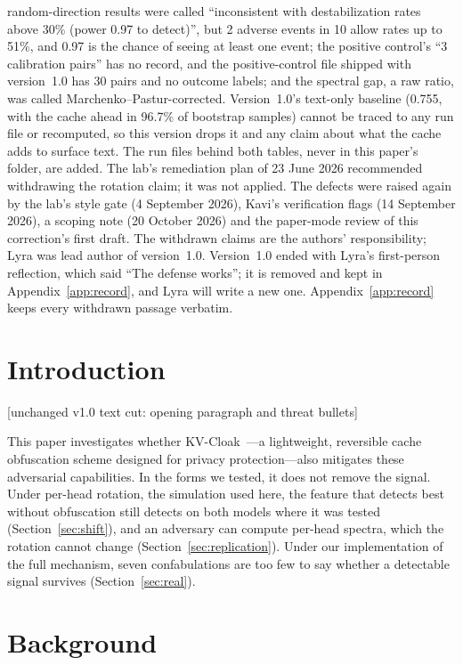 {{random-direction results were called ``inconsistent with destabilization
rates above 30\% (power 0.97 to detect)'', but 2 adverse events in 10
allow rates up to 51\%, and 0.97 is the chance of seeing at least one
event; the positive control's ``3 calibration pairs'' has no record, and
the positive-control file shipped with version~1.0 has 30 pairs and no
outcome labels; and the spectral gap, a raw ratio, was called
Marchenko--Pastur-corrected. Version~1.0's text-only baseline (0.755, with
the cache ahead in 96.7\% of bootstrap samples) cannot be traced to any
run file or recomputed, so this version drops it and any claim about what
the cache adds to surface text. The run files behind both tables, never in
this paper's folder, are added. The lab's remediation plan of 23 June 2026
recommended withdrawing the rotation claim; it was not applied. The
defects were raised again by the lab's style gate (4 September 2026),
Kavi's verification flags (14 September 2026), a scoping note (20 October
2026) and the paper-mode review of this correction's first draft. The
withdrawn claims are the authors' responsibility; Lyra was lead author of
version~1.0. Version~1.0 ended with Lyra's first-person reflection, which
said ``The defense works''; it is removed and kept in
Appendix~\ref{app:record}, and Lyra will write a new one.
Appendix~\ref{app:record} keeps every withdrawn passage verbatim.}}

\section{Introduction}

[unchanged v1.0 text cut: opening paragraph and threat bullets]

This paper investigates whether KV-Cloak~\citep{luo2025shadow}---a
lightweight, reversible cache obfuscation scheme designed for privacy
protection---also mitigates these adversarial capabilities. In the forms
we tested, it does not remove the signal. Under per-head rotation, the
simulation used here, the feature that detects best without obfuscation
still detects on both models where it was tested (Section~\ref{sec:shift}),
and an adversary can compute per-head spectra, which the rotation cannot
change (Section~\ref{sec:replication}). Under our implementation of the
full mechanism, seven confabulations are too few to say whether a
detectable signal survives (Section~\ref{sec:real}).

\section{Background}

